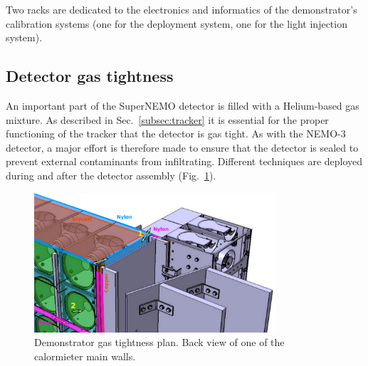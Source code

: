 Two racks are dedicated to the electronics and informatics of the demonstrator's calibration systems (one for the deployment system, one for the light injection system).


\subsection{Detector gas tightness}
\label{subsec:sealing}


An important part of the SuperNEMO detector is filled with a Helium-based gas mixture.
As described in Sec.~\ref{subsec:tracker} it is essential for the proper functioning of the tracker that the detector is gas tight.
As with the NEMO-$3$ detector, a major effort is therefore made to ensure that the detector is sealed to prevent external contaminants from infiltrating.
Different techniques are deployed during and after the detector assembly (Fig.~\ref{fig:sealing_plan}).
\begin{figure}[h!]
\centering
\includegraphics[width=0.8\textwidth]{SNdemonstrator/fig_SNdemonstrator/leaks.pdf}
\caption{Demonstrator gas tightness plan.
  Back view of one of the calormieter main walls.
\label{fig:sealing_plan}}
\end{figure}
